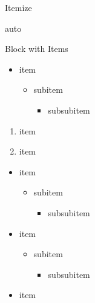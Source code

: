 \documentclass[english,aspectratio=43,t]{beamer}
\begin{document}
\begin{frame}{Itemize}
	\begin{cols}{auto}
		\begin{block}{Block with Items}
			\begin{itemize}
			\item item
				\begin{itemize}
				\item subitem
					\begin{itemize}
					\item subsubitem
					\end{itemize}
				\end{itemize}
			\end{itemize}
		\end{block}
		\begin{block}{}
			\begin{enumerate}
			\item item
			\item item
			\end{enumerate}
		\end{block}
	\col
		\begin{exampleblock}{}
			\begin{itemize}
			\item item
				\begin{itemize}
				\item subitem
					\begin{itemize}
					\item subsubitem
					\end{itemize}
				\end{itemize}
			\end{itemize}
		\end{exampleblock}
		\begin{alertblock}{}
			\begin{itemize}
			\item item
				\begin{itemize}
				\item subitem
					\begin{itemize}
					\item subsubitem
					\end{itemize}
				\end{itemize}
			\end{itemize}
		\end{alertblock}
	\col
		\begin{whiteblock}{}
			\begin{itemize}
			\item item
				\begin{itemize}

\end{itemize}
\end{itemize}
\end{whiteblock}
\end{cols}
\end{frame}
\end{document}
